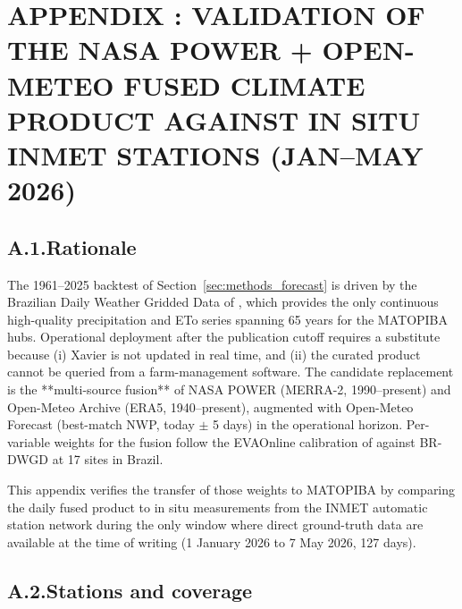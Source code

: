 
\section*{APPENDIX \thesection: VALIDATION OF THE NASA POWER + OPEN-METEO FUSED CLIMATE PRODUCT AGAINST IN SITU INMET STATIONS (JAN--MAY 2026)}
\label{app:inmet_validation}

\subsection*{A.1.\quad Rationale}

The 1961--2025 backtest of Section~\ref{sec:methods_forecast} is driven
by the Brazilian Daily Weather Gridded Data of \citet{Xavier2022},
which provides the only continuous high-quality precipitation and
ETo series spanning 65 years for the MATOPIBA hubs. Operational
deployment after the publication cutoff requires a substitute
because (i) Xavier is not updated in real time, and (ii) the curated
product cannot be queried from a farm-management software. The
candidate replacement is the **multi-source fusion** of NASA POWER
(MERRA-2, 1990--present) and Open-Meteo Archive (ERA5, 1940--present),
augmented with Open-Meteo Forecast (best-match NWP, today $\pm$ 5 days)
in the operational horizon. Per-variable weights for the fusion follow
the EVAOnline calibration of \citet{Ribeiro2024} against BR-DWGD at
17 sites in Brazil.

This appendix verifies the transfer of those weights to MATOPIBA by
comparing the daily fused product to in situ measurements from the
INMET automatic station network during the only window where direct
ground-truth data are available at the time of writing (1 January
2026 to 7 May 2026, 127 days).

\subsection*{A.2.\quad Stations and coverage}

